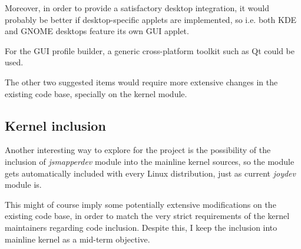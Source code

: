 Moreover, in order to provide a satisfactory desktop integration, it would probably be better if desktop-specific applets are implemented, so i.e. both KDE and GNOME desktops feature its own GUI applet.

For the GUI profile builder, a generic cross-platform toolkit such as Qt could be used.

The other two suggested items would require more extensive changes in the existing code base, specially on the kernel module.


\subsection{Kernel inclusion}
Another interesting way to explore for the project is the possibility of the inclusion of \emph{jsmapperdev} module into the mainline kernel sources, so the module gets automatically included with every Linux distribution, just as current \emph{joydev} module is.

This might of course imply some potentially extensive modifications on the existing code base, in order to match the very strict requirements of the kernel maintainers regarding code inclusion. Despite this, I keep the inclusion into mainline kernel as a mid-term objective.
